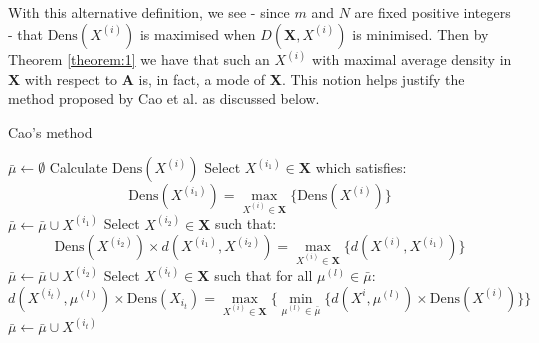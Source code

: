 With this alternative definition, we see - since \(m\) and \(N\) are fixed 
positive integers - that \(\text{Dens}(X^{(i)})\) is maximised when 
\(D(\textbf{X}, X^{(i)})\) is minimised. Then by Theorem \ref{theorem:1} we have
that such an \(X^{(i)}\) with maximal average density in \textbf{X} with respect
to \textbf{A} is, in fact, a mode of \textbf{X}. This notion helps justify the 
method proposed by Cao et al. as discussed below.\\

\begin{algorithm}[H]
\caption{Cao's method}\label{alg:cao}
	\begin{algorithmic}[0]
        \State \(\bar{\mu} \gets \emptyset\)
            \State Calculate \(\text{Dens}(X^{(i)})\)
		\EndFor
        \State Select \(X^{(i_1)} \in \textbf{X}\) which satisfies:
        \[
            \text{Dens}(X^{(i_1)}) = \max_{X^{(i)} \in \textbf{X}} 
            \{\text{Dens}(X^{(i)})\}
        \]
        \State \(\bar{\mu} \gets \bar{\mu} \cup X^{(i_1)}\)
        \State Select \(X^{(i_2)} \in \textbf{X}\) such that: 
		\[
			\text{Dens}(X^{(i_2)}) \times d(X^{(i_1)}, X^{(i_2)}) =
			\max_{X^{(i)} \in \textbf{X}} \{d(X^{(i)}, X^{(i_1)})\}
		\]
        \State \(\bar{\mu} \gets \bar{\mu} \cup X^{(i_2)}\)
            \State Select \(X^{(i_t)} \in \textbf{X}\) such that for all 
                \(\mu^{(l)} \in \bar{\mu}\):
			\[
		        d(X^{(i_t)}, \mu^{(l)}) \times \text{Dens}(X_{i_t}) = 
                \max_{X^{(i)} \in \textbf{X}} \{\min_{\mu^{(l)} \in \bar{\mu}} 
				\{d(X^{i}, \mu^{(l)}) \times \text{Dens}(X^{(i)}) \}\}
			\]
            \State \(\bar{\mu} \gets \bar{\mu} \cup X^{(i_t)}\)
		\EndWhile
	\end{algorithmic}
\end{algorithm}

